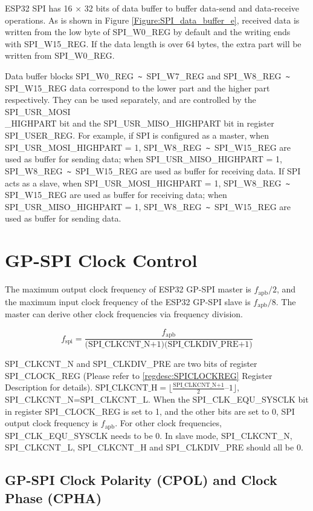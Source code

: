 \documentclass[main\_\_EN.tex]{subfiles}
\begin{document}
ESP32 SPI has 16 × 32 bits of data buffer to buffer data-send and data-receive operations. As is shown in Figure \ref{Figure:SPI_data_buffer_e}, received data is written from the low byte of SPI\_W0\_REG by default and the writing ends with SPI\_W15\_REG. If the data length is over 64 bytes, the extra part will be written from SPI\_W0\_REG.

Data buffer blocks SPI\_W0\_REG\verb+ ~ +SPI\_W7\_REG and SPI\_W8\_REG\verb+ ~ +SPI\_W15\_REG data correspond to the lower part and the higher part respectively. They can be used separately, and are controlled by the SPI\_USR\_MOSI\\\_HIGHPART bit and the SPI\_USR\_MISO\_HIGHPART bit in register SPI\_USER\_REG. For example, if SPI is configured as a master, when SPI\_USR\_MOSI\_HIGHPART = 1, SPI\_W8\_REG\verb+ ~ +SPI\_W15\_REG are used as buffer for sending data; when SPI\_USR\_MISO\_HIGHPART = 1, SPI\_W8\_REG\verb+ ~ +SPI\_W15\_REG are used as buffer for receiving data. If SPI acts as a slave, when SPI\_USR\_MOSI\_HIGHPART = 1, SPI\_W8\_REG\verb+ ~ +SPI\_W15\_REG are used as buffer for receiving data; when SPI\_USR\_MISO\_HIGHPART = 1, SPI\_W8\_REG\verb+ ~ +SPI\_W15\_REG are used as buffer for sending data.

\section{GP-SPI Clock Control}

The maximum output clock frequency of ESP32 GP-SPI master is $f_{\textrm{apb}}/2$, and the maximum input clock frequency of the ESP32 GP-SPI slave is $f_{\textrm{apb}}/8$. The master can derive other clock frequencies via frequency division.

 \[
    f_{\textrm{spi}}=\frac{f_{\textrm{apb}}} {\textrm{(SPI\_CLKCNT\_N+1)(SPI\_CLKDIV\_PRE+1)}}
    \]

SPI\_CLKCNT\_N and SPI\_CLKDIV\_PRE are two bits of register SPI\_CLOCK\_REG (Please refer to \ref{regdesc:SPICLOCKREG} Register Description for details). $\textrm{SPI\_CLKCNT\_H} =\lfloor \frac{\textrm{SPI\_CLKCNT\_N+1}}{2} – 1\rfloor$, SPI\_CLKCNT\_N=SPI\_CLKCNT\_L. When the SPI\_CLK\_EQU\_SYSCLK bit in register SPI\_CLOCK\_REG is set to 1, and the other bits are set to 0, SPI output clock frequency is $f_{\textrm{apb}}$. For other clock frequencies, SPI\_CLK\_EQU\_SYSCLK needs to be 0. In slave mode, SPI\_CLKCNT\_N, SPI\_CLKCNT\_L, SPI\_CLKCNT\_H and SPI\_CLKDIV\_PRE should all be 0.

\subsection{GP-SPI Clock Polarity (CPOL) and Clock Phase (CPHA)}\label{GP-SPI Clock Polarity (CPOL) and Clock Phase (CPHA)}
\end{document}
